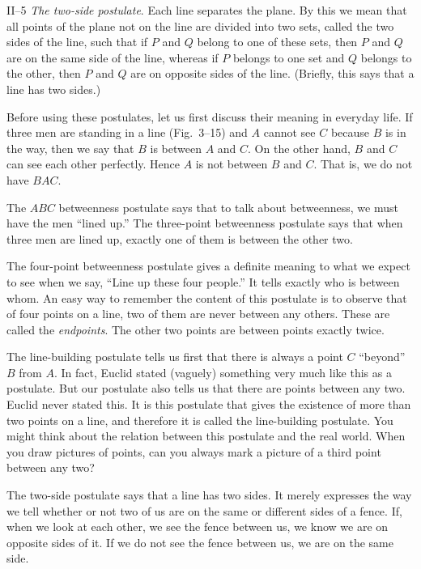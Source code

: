 \documentclass[11pt]{book}
\theoremstyle{bkplain}
\theoremstyle{XIplainnote}
\theoremstyle{bkplain}
\theoremstyle{bkplain}
\begin{document}
\medskip
\noindent II--5 \emph{The two-side postulate}. Each line separates the plane. By
this we mean that all points of the plane not on the line are divided into two
sets, called the two sides of the line, such that if $P$ and $Q$ belong to one of
these sets, then $P$ and $Q$ are on the same side of the line, whereas if $P$
belongs to one set and $Q$ belongs to the other, then $P$ and $Q$ are on opposite
sides of the line. (Briefly, this says that a line has two sides.)

\medskip
Before using these postulates, let us first discuss their meaning in everyday
life. If three men are standing in a line (Fig.~3--15) and $A$ cannot see $C$
because $B$ is in the way, then we say that $B$ is between $A$ and $C$. On the
other hand, $B$ and $C$ can see each other perfectly. Hence $A$ is not between
$B$ and $C$. That is, we do not have $BAC$.

\FIGIIIFIFTEEN

The $ABC$ betweenness postulate says that to talk about betweenness, we must have
the men ``lined up.'' The three-point betweenness postulate says that when three
men are lined up, exactly one of them is between the other two.

The four-point betweenness postulate gives a definite meaning to what we expect
to see when we say, ``Line up these four people.'' It tells exactly who is
between whom. An easy way to remember the content of this postulate is to observe
that of four points on a line, two of them are never between any others. These
are called the \emph{endpoints}. The other two points are between points exactly
twice.

The line-building postulate tells us first that there is always a point $C$
``beyond'' $B$ from $A$. In fact, Euclid stated (vaguely) something very much
like this as a postulate. But our postulate also tells us that there are points
between any two. Euclid never stated this. It is this postulate that gives the
existence of more than two points on a line, and therefore it is called the
line-building postulate. You might think about the relation between this
postulate and the real world. When you draw pictures of points, can you always
mark a picture of a third point between any two?

The two-side postulate says that a line has two sides. It merely expresses the
way we tell whether or not two of us are on the same or different sides of a
fence. If, when we look at each other, we see the fence between us, we know we
are on opposite sides of it. If we do not see the fence between us, we are on the
same side.
\end{document}
